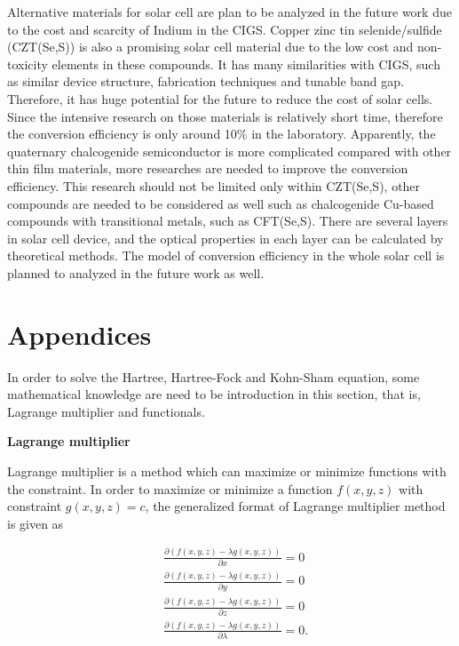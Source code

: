 \documentclass[a4paper, 12pt, titlepage,oneside,drop]{kthesis}
\begin{document}
Alternative materials for solar cell are plan to be analyzed in the future work due to the cost and scarcity of Indium in the CIGS. Copper zinc tin selenide/sulfide (CZT(Se,S)) is also a promising solar cell material due to the 
low cost and non-toxicity elements in these compounds. It has many similarities with CIGS, such as similar device structure, fabrication techniques and tunable band gap. Therefore, it has huge potential for the future to reduce
the cost of solar cells. Since the intensive research on those materials is relatively short time, therefore the conversion efficiency is only around 10\% in the laboratory. Apparently, the quaternary chalcogenide semiconductor is more 
complicated compared with other thin film materials, more researches are needed to improve the conversion efficiency.  This research should not be limited only within CZT(Se,S), other compounds are needed to be considered as well such as
chalcogenide Cu-based compounds with transitional metals, such as CFT(Se,S). There are several layers in solar cell device, and the optical properties in each layer can be calculated by theoretical methods. 
The model of conversion efficiency in the whole solar cell is planned to analyzed in the future work as well. 



 


\chapter{Appendices}

In order to solve the Hartree, Hartree-Fock and Kohn-Sham equation, some mathematical knowledge are need to be introduction in this section, that is, Lagrange multiplier and functionals.

\textbf{Lagrange multiplier}

Lagrange multiplier is a method which can maximize or minimize functions with the constraint. In order to maximize or minimize a function $f(x,y,z)$ with constraint $g(x,y,z) = c$,  the generalized format of Lagrange multiplier
method is given as

\begin{equation}
\begin{split}
& \frac{\partial \left( f(x,y,z) - \lambda g(x,y,z)\right)}{\partial x} = 0 \\
& \frac{\partial \left( f(x,y,z) - \lambda g(x,y,z)\right)}{\partial y} = 0 \\
& \frac{\partial \left( f(x,y,z) - \lambda g(x,y,z)\right)}{\partial z} = 0 \\
& \frac{\partial \left( f(x,y,z) - \lambda g(x,y,z)\right)}{\partial \lambda} = 0.
\end{split}
\end{equation}
\end{document}
